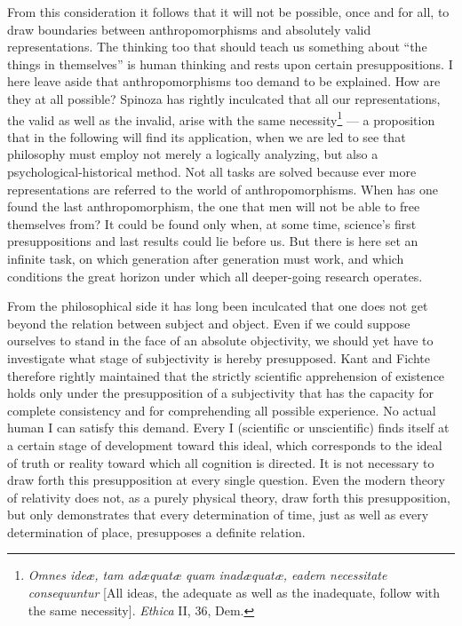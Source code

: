 \documentclass[12pt]{book}
\newcommand{\opage}[1]{\marginnote{\footnotesize\textit{[#1]}}}
\begin{document}
From this consideration it follows that it will not be possible, once and for all, to draw boundaries
between anthropomorphisms and absolutely valid representations. The thinking too that should teach us
something about ``the things in themselves'' is human thinking and rests upon certain presuppositions.
I here leave aside that anthropomorphisms too demand to be explained. How are they at all possible?
Spinoza has rightly inculcated that all our representations, the valid as well as the invalid, arise
with the same necessity\footnote{\textit{Omnes ideæ, tam adæquatæ quam inadæquatæ, eadem necessitate
consequuntur} [All ideas, the adequate as well as the inadequate, follow with the same necessity].
\textit{Ethica} II, 36, Dem.} --- a proposition that in the following will find its application, when
we are led to see that philosophy must employ not merely a logically analyzing, but also a
psychological-historical method. Not all tasks are solved because ever more representations are
referred to the world of anthropomorphisms. When has one found the last anthropomorphism, the one that
men will not be able to free themselves from? It could be found only when, at some time, science's
first presuppositions and last results could lie before us. But there is here set an infinite task, on
which generation after generation must work, and which conditions the great horizon under which all
deeper-going research operates.

From the philosophical side it has long been inculcated that one does not get beyond the relation
between subject and object. Even if we could suppose ourselves to stand in the face of an absolute
\opage{18}objectivity, we should yet have to investigate what stage of subjectivity is hereby presupposed. Kant
and Fichte therefore rightly maintained that the strictly scientific apprehension of existence holds
only under the presupposition of a subjectivity that has the capacity for complete consistency and for
comprehending all possible experience. No actual human I can satisfy this demand. Every I (scientific
or unscientific) finds itself at a certain stage of development toward this ideal, which corresponds
to the ideal of truth or reality toward which all cognition is directed. It is not necessary to draw
forth this presupposition at every single question. Even the modern theory of relativity does not, as
a purely physical theory, draw forth this presupposition, but only demonstrates that every
determination of time, just as well as every determination of place, presupposes a definite relation.
\end{document}

